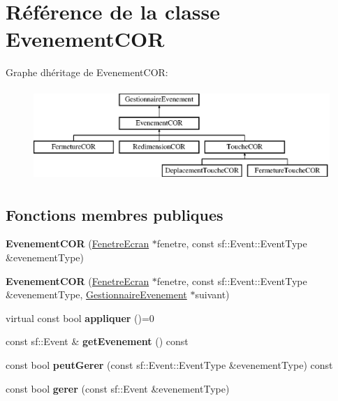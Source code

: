 \hypertarget{class_evenement_c_o_r}{}\section{Référence de la classe Evenement\+C\+OR}
\label{class_evenement_c_o_r}
Graphe d\textquotesingle{}héritage de Evenement\+C\+OR\+:\begin{figure}[H]
\begin{center}
\leavevmode
\includegraphics[height=3.456790cm]{class_evenement_c_o_r}
\end{center}
\end{figure}
\subsection*{Fonctions membres publiques}
\begin{DoxyCompactItemize}
\item 
\mbox{\label{class_evenement_c_o_r_a967b2183316a1c66058a739768897dd7}} 
{\bfseries Evenement\+C\+OR} (\mbox{\hyperlink{class_fenetre_ecran}{Fenetre\+Ecran}} $\ast$fenetre, const sf\+::\+Event\+::\+Event\+Type \&evenement\+Type)
\item 
\mbox{\label{class_evenement_c_o_r_a653aa6a9e72e3f7c19f2c90251f9e41b}} 
{\bfseries Evenement\+C\+OR} (\mbox{\hyperlink{class_fenetre_ecran}{Fenetre\+Ecran}} $\ast$fenetre, const sf\+::\+Event\+::\+Event\+Type \&evenement\+Type, \mbox{\hyperlink{class_gestionnaire_evenement}{Gestionnaire\+Evenement}} $\ast$suivant)
\item 
\mbox{\label{class_evenement_c_o_r_aac535ddfabef58632122210084d4ae13}} 
virtual const bool {\bfseries appliquer} ()=0
\item 
\mbox{\label{class_evenement_c_o_r_a687e79d9afd5bbbad359efaf99e55b52}} 
const sf\+::\+Event \& {\bfseries get\+Evenement} () const
\item 
\mbox{\label{class_evenement_c_o_r_a055b557925de1b71efc2680e86455432}} 
const bool {\bfseries peut\+Gerer} (const sf\+::\+Event\+::\+Event\+Type \&evenement\+Type) const
\item 
\mbox{\label{class_evenement_c_o_r_a93b6f432ce8d11226ea4eaf73d633c6e}} 
const bool {\bfseries gerer} (const sf\+::\+Event \&evenement\+Type)
\end{DoxyCompactItemize}
